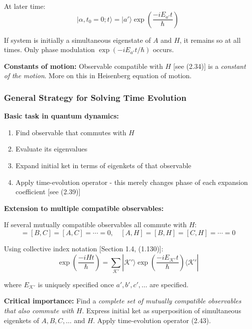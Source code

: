 \documentclass[11pt,a4paper]{article}
\begin{document}
At later time:
\begin{equation}
|\alpha, t_0 = 0; t\rangle = |a'\rangle\exp\left(\frac{-iE_{a'}t}{\hbar}\right)
\tag{2.41}
\end{equation}

If system is initially a simultaneous eigenstate of $A$ and $H$, it remains so at all times. Only phase modulation $\exp(-iE_{a'}t/\hbar)$ occurs.

\textbf{Constants of motion:} Observable compatible with $H$ [see (2.34)] is a \textit{constant of the motion}. More on this in Heisenberg equation of motion.

\subsubsection{General Strategy for Solving Time Evolution}

\textbf{Basic task in quantum dynamics:}
\begin{enumerate}
\item Find observable that commutes with $H$
\item Evaluate its eigenvalues
\item Expand initial ket in terms of eigenkets of that observable
\item Apply time-evolution operator - this merely changes phase of each expansion coefficient [see (2.39)]
\end{enumerate}

\textbf{Extension to multiple compatible observables:}

If several mutually compatible observables all commute with $H$:
\begin{equation}
[A,B] = [B,C] = [A,C] = \cdots = 0, \quad [A,H] = [B,H] = [C,H] = \cdots = 0
\tag{2.42}
\end{equation}

Using collective index notation [Section 1.4, (1.130)]:
\begin{equation}
\exp\left(\frac{-iHt}{\hbar}\right) = \sum_{\mathcal{K}'}|\mathcal{K}'\rangle\exp\left(\frac{-iE_{\mathcal{K}'}t}{\hbar}\right)\langle\mathcal{K}'|
\tag{2.43}
\end{equation}

where $E_{\mathcal{K}'}$ is uniquely specified once $a', b', c', \ldots$ are specified.

\textbf{Critical importance:} Find a \textit{complete set of mutually compatible observables that also commute with $H$}. Express initial ket as superposition of simultaneous eigenkets of $A, B, C, \ldots$ and $H$. Apply time-evolution operator (2.43).
\end{document}
